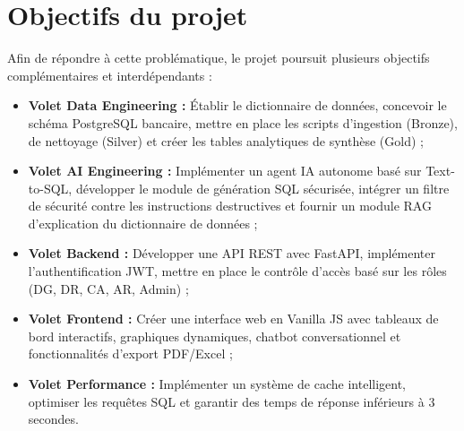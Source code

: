 \documentclass[a4paper,12pt]{report}
\begin{document}
\section{Objectifs du projet}
\begin{doublespace}
Afin de répondre à cette problématique, le projet poursuit plusieurs objectifs complémentaires et interdépendants :
\begin{itemize}
    \item \textbf{Volet Data Engineering :} Établir le dictionnaire de données, concevoir le schéma PostgreSQL bancaire, mettre en place les scripts d'ingestion (Bronze), de nettoyage (Silver) et créer les tables analytiques de synthèse (Gold) ;
    \item \textbf{Volet AI Engineering :} Implémenter un agent IA autonome basé sur Text-to-SQL, développer le module de génération SQL sécurisée, intégrer un filtre de sécurité contre les instructions destructives et fournir un module RAG d'explication du dictionnaire de données ;
    \item \textbf{Volet Backend :} Développer une API REST avec FastAPI, implémenter l'authentification JWT, mettre en place le contrôle d'accès basé sur les rôles (DG, DR, CA, AR, Admin) ;
    \item \textbf{Volet Frontend :} Créer une interface web en Vanilla JS avec tableaux de bord interactifs, graphiques dynamiques, chatbot conversationnel et fonctionnalités d'export PDF/Excel ;
    \item \textbf{Volet Performance :} Implémenter un système de cache intelligent, optimiser les requêtes SQL et garantir des temps de réponse inférieurs à 3 secondes.
\end{itemize}
\end{doublespace}
\end{document}
